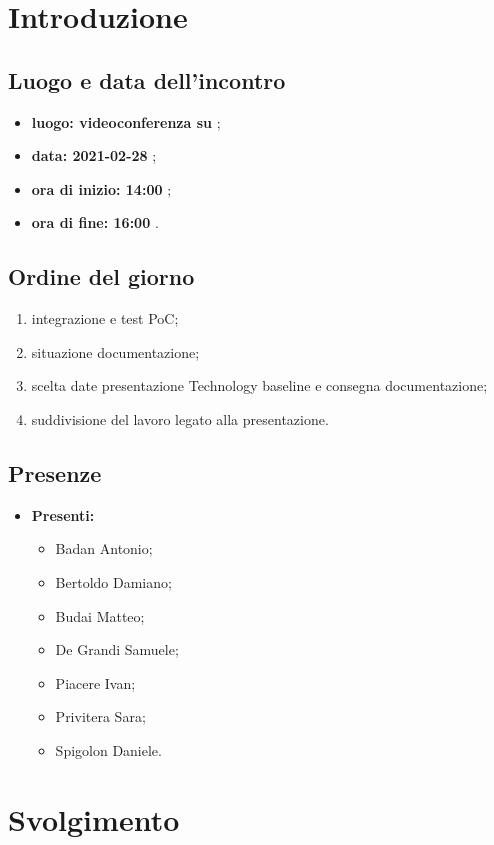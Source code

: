 \section*{Introduzione}
\subsection*{Luogo e data dell'incontro}
\begin{itemize}
	\item \textbf{luogo: videoconferenza su } ;
	\item \textbf{data: 2021-02-28} ;
	\item \textbf{ora di inizio: 14:00} ;
	\item \textbf{ora di fine: 16:00} .
\end{itemize}

\subsection*{Ordine del giorno}
\begin{enumerate}
	\item integrazione e test PoC;
	\item situazione documentazione;
	\item scelta date presentazione Technology baseline e consegna documentazione;
	\item suddivisione del lavoro legato alla presentazione.
\end{enumerate}

\subsection*{Presenze}
\begin{itemize}
	\item \textbf{Presenti:}
	\begin{itemize}
		\item Badan Antonio;
		\item Bertoldo Damiano;
		\item Budai Matteo;
		\item De Grandi Samuele;
		\item Piacere Ivan;
		\item Privitera Sara;
		\item Spigolon Daniele.
	\end{itemize}
\end{itemize}

\section*{Svolgimento}

